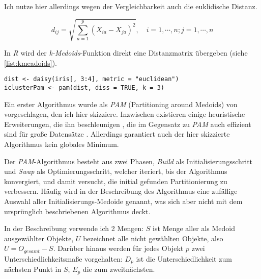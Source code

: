\documentclass[a4paper,12pt,twoside]{article}
\newcommand{\Fachbegriff}[1]{\textit{#1}}
\begin{document}
Ich nutze hier allerdings wegen der Vergleichbarkeit auch die euklidische Distanz. 

\begin{equation}
d_{ij} = \sqrt{\sum_{a=1}^p (X_{ia}-X_{ja})^2}, \quad i=1,\cdots,n; j=1,\cdots,n
\end{equation}

In \Fachbegriff{R} wird der \Fachbegriff {k-Medoids}-Funktion direkt eine Distanzmatrix übergeben (siehe \autoref{list:kmeadoids}).

\begin{minipage}{\linewidth}
\begin{lstlisting}[caption={\Fachbegriff{K-Medoids} in \Fachbegriff{R}}, label=list:kmeadoids]
dist <- daisy(iris[, 3:4], metric = "euclidean")
iclusterPam <- pam(dist, diss = TRUE, k = 3)
\end{lstlisting}
\end{minipage}

Ein erster Algorithmus wurde als \Fachbegriff {PAM} (Partitioning around Medoids) von \textcite{Kaufman.2009} vorgeschlagen, den ich hier skizziere. Inzwischen existieren einige heuristische Erweiterungen, die ihn beschleunigen \autocite[z.\,B.][] {Park.2009}, die im Gegensatz zu \Fachbegriff {PAM} auch effizient sind für große Datensätze \autocite[vgl. auch CLARA][]{Kaufman.2009}. Allerdings garantiert auch der hier skizzierte Algorithmus kein globales Minimum.

Der \Fachbegriff {PAM}-Algorithmus besteht aus zwei Phasen, \Fachbegriff {Build} als Initialisierungsschritt und \Fachbegriff {Swap} als Optimierungsschritt, welcher iteriert, bis der Algorithmus konvergiert, und damit versucht, die initial gefunden Partitionierung zu verbessern. Häufig wird in der Beschreibung des Algorithmus eine zufällige Auswahl aller Initialisierungs-Medoide genannt, was sich aber nicht mit dem ursprünglich beschriebenen Algorithmus deckt.

In der Beschreibung verwende ich 2 Mengen: $S$ ist Menge aller als Medoid ausgewählter Objekte, $U$ bezeichnet alle nicht gewählten Objekte, also $U=O_{gesamt} - S$. Darüber hinaus werden für jedes Objekt $p$ zwei Unterschiedlichkeitsmaße vorgehalten: $D_p$ ist die Unterschiedlichkeit zum nächsten Punkt in $S$, $E_p$ die zum zweitnächsten.
\end{document}
